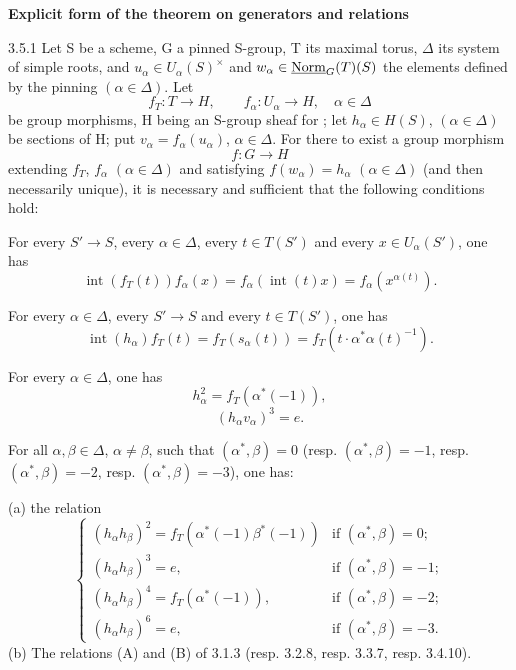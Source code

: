 \textbf{Explicit form of the theorem on generators and relations}
\begin{theorem}{3.5.1}\label{XXIII.3.5.1}
Let S be a scheme, G a pinned S-group, T its maximal torus, $\Delta$ its system of simple roots, and $u_\alpha\in U_\alpha(S)^\times$ and $w_\alpha\in\underline{\mathrm{Norm}}_G(T)(S)$ the elements defined by the pinning $(\alpha\in\Delta)$. Let
\[
f_T:T\to H,\qquad f_\alpha:U_\alpha\to H,\quad\alpha\in\Delta
\]
be group morphisms, H being an S-group sheaf for \fppf; let $h_\alpha\in H(S)$, $(\alpha\in\Delta)$ be sections of H; put $v_\alpha=f_\alpha(u_\alpha)$, $\alpha\in\Delta$. For there to exist a group morphism
\[
f:G\to H
\]
extending $f_T$, $f_\alpha$ $(\alpha\in\Delta)$ and satisfying $f(w_\alpha)=h_\alpha$ $(\alpha\in\Delta)$ (and then necessarily unique), it is necessary and sufficient that the following conditions hold:
\begin{enumeratei}
\item For every $S'\to S$, every $\alpha\in\Delta$, every $t\in T(S')$ and every $x\in U_\alpha(S')$, one has
\begin{equation}\tag{1}
\operatorname{int}(f_T(t))f_\alpha(x)=f_\alpha(\operatorname{int}(t)x)=f_\alpha(x^{\alpha(t)}).
\end{equation}
\item For every $\alpha\in\Delta$, every $S'\to S$ and every $t\in T(S')$, one has
\begin{equation}\tag{2}
\operatorname{int}(h_\alpha)f_T(t)=f_T(s_\alpha(t))=f_T(t\cdot\alpha^*\alpha(t)^{-1}).
\end{equation}
\item For every $\alpha\in\Delta$, one has
\begin{equation}\tag{$3_1$}
h_\alpha^2=f_T(\alpha^*(-1)),
\end{equation}
\begin{equation}\tag{4}
(h_\alpha v_\alpha)^3=e.
\end{equation}
\item For all $\alpha,\beta\in\Delta$, $\alpha\ne\beta$, such that $(\alpha^*,\beta)=0$ (resp. $(\alpha^*,\beta)=-1$, resp. $(\alpha^*,\beta)=-2$, resp. $(\alpha^*,\beta)=-3$), one has:

(a) the relation
\begin{equation}\tag{$3_2$}
\begin{cases}
(h_\alpha h_\beta)^2=f_T(\alpha^*(-1)\beta^*(-1))&\text{if }(\alpha^*,\beta)=0;\\
(h_\alpha h_\beta)^3=e,&\text{if }(\alpha^*,\beta)=-1;\\
(h_\alpha h_\beta)^4=f_T(\alpha^*(-1)),&\text{if }(\alpha^*,\beta)=-2;\\
(h_\alpha h_\beta)^6=e,&\text{if }(\alpha^*,\beta)=-3.
\end{cases}
\end{equation}
(b) The relations (A) and (B) of 3.1.3 (resp. 3.2.8, resp. 3.3.7, resp. 3.4.10).
\end{enumeratei}
\end{theorem}
